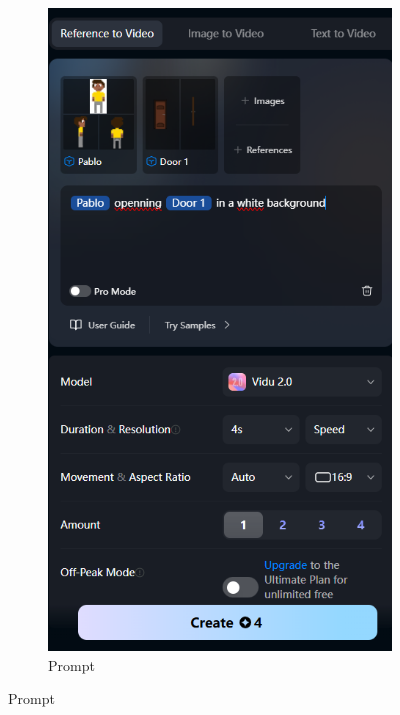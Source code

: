 \begin{figure}[htbp]
    \centering
    \caption{\small Processo da utilização 7 do Vidu em agosto/2025}
    \label{fig:vidu12}
    \begin{subfigure}{0.35\linewidth}
        \includegraphics[width=1\linewidth]{figs/vidu/tela12.PNG}
        \caption{\small Prompt}
        \label{fig:vidu12a}
    \end{subfigure}

\end{figure}
